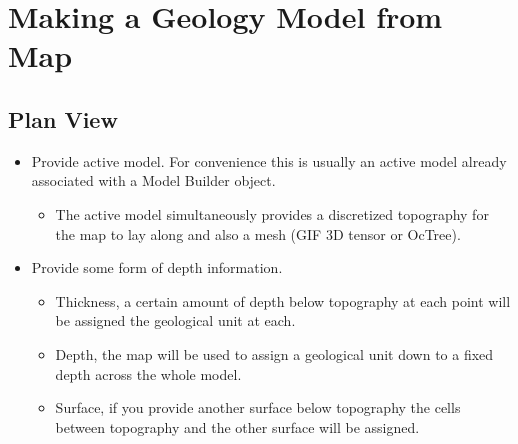 \section{Making a Geology Model from Map}
\label{sec:Make Geology Model from Map}

\subsection{Plan View}
\label{subsec:Make Geology Model from Map Plan View}

\begin{itemize}
\item Provide active model. For convenience this is usually an active model already associated with a Model Builder object.
\begin{itemize}
	\item The active model simultaneously provides a discretized topography for the map to lay along and also a mesh (\ac{GIF} 3D tensor or OcTree).
\end{itemize}
\item Provide some form of depth information.
\begin{itemize}
	\item Thickness, a certain amount of depth below topography at each point will be assigned the geological unit at each.
	\item Depth, the map will be used to assign a geological unit down to a fixed depth across the whole model.
	\item Surface, if you provide another surface below topography the cells between topography and the other surface will be assigned.
\end{itemize}


\end{itemize}
